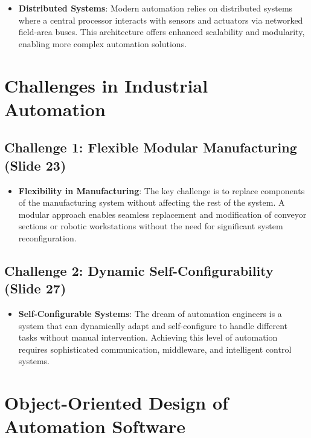 \documentclass[
  14pt,
  a4paper,
  numbers=noendperiod,
  headinclude=true,
  footinclude=true,
  DIV=calc]{scrreprt}
\providecommand{\tightlist}{%
  \setlength{\itemsep}{0pt}\setlength{\parskip}{0pt}}\usepackage{longtable,booktabs,array}
\begin{document}
\begin{itemize}
\tightlist
\item
  \textbf{Distributed Systems}: Modern automation relies on distributed
  systems where a central processor interacts with sensors and actuators
  via networked field-area buses. This architecture offers enhanced
  scalability and modularity, enabling more complex automation
  solutions.
\end{itemize}

\section{Challenges in Industrial
Automation}\label{challenges-in-industrial-automation}

\subsection{Challenge 1: Flexible Modular Manufacturing (Slide
23)}\label{challenge-1-flexible-modular-manufacturing-slide-23}

\begin{itemize}
\tightlist
\item
  \textbf{Flexibility in Manufacturing}: The key challenge is to replace
  components of the manufacturing system without affecting the rest of
  the system. A modular approach enables seamless replacement and
  modification of conveyor sections or robotic workstations without the
  need for significant system reconfiguration.
\end{itemize}

\subsection{Challenge 2: Dynamic Self-Configurability (Slide
27)}\label{challenge-2-dynamic-self-configurability-slide-27}

\begin{itemize}
\tightlist
\item
  \textbf{Self-Configurable Systems}: The dream of automation engineers
  is a system that can dynamically adapt and self-configure to handle
  different tasks without manual intervention. Achieving this level of
  automation requires sophisticated communication, middleware, and
  intelligent control systems.
\end{itemize}

\section{Object-Oriented Design of Automation
Software}\label{object-oriented-design-of-automation-software}
\end{document}
